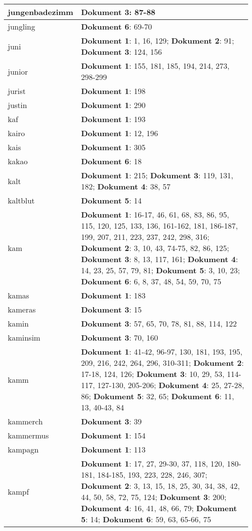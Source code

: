 \documentclass[a5paper]{article}
\begin{document}
\begin{longtable}[l]{|l|p{3in}|}
\hline
jungenbadezimm & \textbf{Dokument 3}: 87-88 \\
\hline
jungling & \textbf{Dokument 6}: 69-70 \\
\hline
juni & \textbf{Dokument 1}: 1, 16, 129; \textbf{Dokument 2}: 91; \textbf{Dokument 3}: 124, 156 \\
\hline
junior & \textbf{Dokument 1}: 155, 181, 185, 194, 214, 273, 298-299 \\
\hline
jurist & \textbf{Dokument 1}: 198 \\
\hline
justin & \textbf{Dokument 1}: 290 \\
\hline
kaf & \textbf{Dokument 1}: 193 \\
\hline
kairo & \textbf{Dokument 1}: 12, 196 \\
\hline
kais & \textbf{Dokument 1}: 305 \\
\hline
kakao & \textbf{Dokument 6}: 18 \\
\hline
kalt & \textbf{Dokument 1}: 215; \textbf{Dokument 3}: 119, 131, 182; \textbf{Dokument 4}: 38, 57 \\
\hline
kaltblut & \textbf{Dokument 5}: 14 \\
\hline
kam & \textbf{Dokument 1}: 16-17, 46, 61, 68, 83, 86, 95, 115, 120, 125, 133, 136, 161-162, 181, 186-187, 199, 207, 211, 223, 237, 242, 298, 316; \textbf{Dokument 2}: 3, 10, 43, 74-75, 82, 86, 125; \textbf{Dokument 3}: 8, 13, 117, 161; \textbf{Dokument 4}: 14, 23, 25, 57, 79, 81; \textbf{Dokument 5}: 3, 10, 23; \textbf{Dokument 6}: 6, 8, 37, 48, 54, 59, 70, 75 \\
\hline
kamas & \textbf{Dokument 1}: 183 \\
\hline
kameras & \textbf{Dokument 3}: 15 \\
\hline
kamin & \textbf{Dokument 3}: 57, 65, 70, 78, 81, 88, 114, 122 \\
\hline
kaminsim & \textbf{Dokument 3}: 70, 160 \\
\hline
kamm & \textbf{Dokument 1}: 41-42, 96-97, 130, 181, 193, 195, 209, 216, 242, 264, 296, 310-311; \textbf{Dokument 2}: 17-18, 124, 126; \textbf{Dokument 3}: 10, 29, 53, 114-117, 127-130, 205-206; \textbf{Dokument 4}: 25, 27-28, 86; \textbf{Dokument 5}: 32, 65; \textbf{Dokument 6}: 11, 13, 40-43, 84 \\
\hline
kammerch & \textbf{Dokument 3}: 39 \\
\hline
kammermus & \textbf{Dokument 1}: 154 \\
\hline
kampagn & \textbf{Dokument 1}: 113 \\
\hline
kampf & \textbf{Dokument 1}: 17, 27, 29-30, 37, 118, 120, 180-181, 184-185, 193, 223, 228, 246, 307; \textbf{Dokument 2}: 3, 13, 15, 18, 25, 30, 34, 38, 42, 44, 50, 58, 72, 75, 124; \textbf{Dokument 3}: 200; \textbf{Dokument 4}: 16, 41, 48, 66, 79; \textbf{Dokument 5}: 14; \textbf{Dokument 6}: 59, 63, 65-66, 75 \\

\end{longtable}
\end{document}

